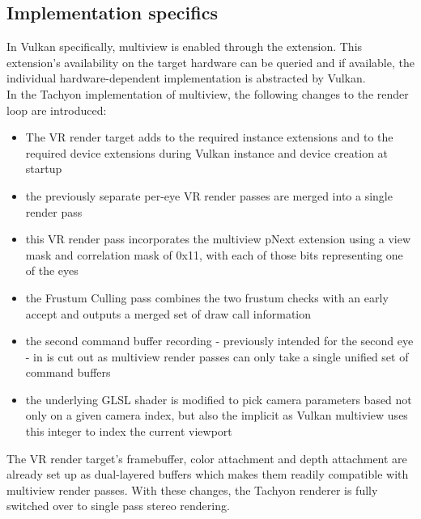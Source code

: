 \subsection{Implementation specifics}
In Vulkan specifically, multiview is enabled through the  extension. This extension's availability on the target hardware can be queried and if available, the individual hardware-dependent implementation is abstracted by Vulkan. \\
In the Tachyon implementation of multiview, the following changes to the render loop are introduced: 
\begin{itemize}
\item The VR render target adds  to the required instance extensions and  to the required device extensions during Vulkan instance and device creation at startup
\item the previously separate per-eye VR render passes are merged into a single render pass
\item this VR render pass incorporates the multiview pNext extension using a view mask and correlation mask of 0x11, with each of those bits representing one of the eyes
\item the Frustum Culling pass combines the two frustum checks with an early accept and outputs a merged set of draw call information
\item the second command buffer recording - previously intended for the second eye - in  is cut out as multiview render passes can only take a single unified set of command buffers
\item the underlying GLSL shader is modified to pick camera parameters based not only on a given camera index, but also the implicit  as Vulkan multiview uses this integer to index the current viewport
\end{itemize}
The VR render target's framebuffer, color attachment and depth attachment are already set up as dual-layered buffers which makes them readily compatible with multiview render passes. With these changes, the Tachyon renderer is fully switched over to single pass stereo rendering. 